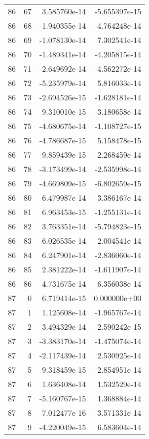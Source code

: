 \begin{tabular}{rrrr}
  86 &   67 &  3.585760e-14 & -5.655397e-15 \\
  86 &   68 & -1.940355e-14 & -4.764248e-14 \\
  86 &   69 & -1.078130e-14 &  7.302541e-14 \\
  86 &   70 & -1.489341e-14 & -4.205815e-14 \\
  86 &   71 & -2.649692e-14 & -4.562272e-14 \\
  86 &   72 & -5.235979e-14 &  5.816033e-14 \\
  86 &   73 & -2.694526e-15 & -1.628181e-14 \\
  86 &   74 &  9.310010e-15 & -3.180658e-14 \\
  86 &   75 & -4.680675e-14 & -1.108727e-15 \\
  86 &   76 & -4.786687e-15 &  5.158478e-15 \\
  86 &   77 &  9.859439e-15 & -2.268459e-14 \\
  86 &   78 & -3.173499e-14 & -2.535998e-14 \\
  86 &   79 & -4.669809e-15 & -6.802659e-15 \\
  86 &   80 &  6.479987e-14 & -3.386167e-14 \\
  86 &   81 &  6.963453e-15 & -1.255131e-14 \\
  86 &   82 &  3.763351e-14 & -5.794823e-15 \\
  86 &   83 &  6.026535e-14 &  2.004541e-14 \\
  86 &   84 &  6.247901e-14 & -2.836060e-14 \\
  86 &   85 &  2.381222e-14 & -1.611907e-14 \\
  86 &   86 &  4.731675e-14 & -6.356038e-14 \\
  87 &    0 &  6.719414e-15 &  0.000000e+00 \\
  87 &    1 &  1.125608e-14 & -1.965767e-14 \\
  87 &    2 &  3.494329e-14 & -2.590242e-15 \\
  87 &    3 & -3.383170e-14 & -1.475074e-14 \\
  87 &    4 & -2.117439e-14 &  2.530925e-14 \\
  87 &    5 &  9.318459e-15 & -2.854951e-14 \\
  87 &    6 &  1.636408e-14 &  1.532529e-14 \\
  87 &    7 & -5.160767e-15 &  1.368884e-14 \\
  87 &    8 &  7.012477e-16 & -3.571331e-14 \\
  87 &    9 & -4.220049e-15 &  6.583604e-14 \\

\end{tabular}
